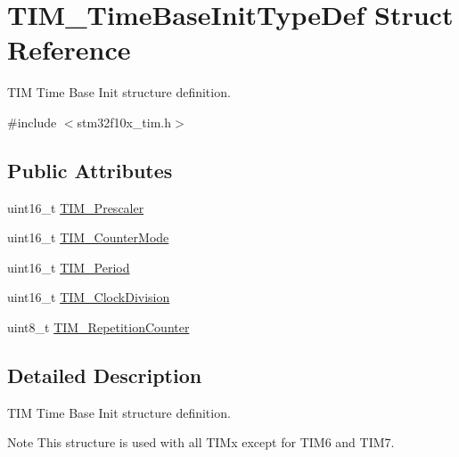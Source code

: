 \hypertarget{structTIM__TimeBaseInitTypeDef}{
\section{TIM\_\-TimeBaseInitTypeDef Struct Reference}
\label{structTIM__TimeBaseInitTypeDef}
}


TIM Time Base Init structure definition.  




{\ttfamily \#include $<$stm32f10x\_\-tim.h$>$}

\subsection*{Public Attributes}
\begin{DoxyCompactItemize}
\item 
uint16\_\-t \hyperlink{structTIM__TimeBaseInitTypeDef_a6d3c8632780db819b2eb811e71ce251e}{TIM\_\-Prescaler}
\item 
uint16\_\-t \hyperlink{structTIM__TimeBaseInitTypeDef_a0de4138cd939566bc667f21df089e195}{TIM\_\-CounterMode}
\item 
uint16\_\-t \hyperlink{structTIM__TimeBaseInitTypeDef_aeb5b90dc8f8a1ab85584e732789b2ee4}{TIM\_\-Period}
\item 
uint16\_\-t \hyperlink{structTIM__TimeBaseInitTypeDef_ab473f51adaa9474702e454fc8c24a407}{TIM\_\-ClockDivision}
\item 
uint8\_\-t \hyperlink{structTIM__TimeBaseInitTypeDef_a81648259851390e090e1f507dfea7de8}{TIM\_\-RepetitionCounter}
\end{DoxyCompactItemize}


\subsection{Detailed Description}
TIM Time Base Init structure definition. \begin{DoxyNote}{Note}
This structure is used with all TIMx except for TIM6 and TIM7. 
\end{DoxyNote}


